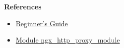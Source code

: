 \documentclass[12pt, a4paper]{article}
\begin{document}
\begin{enumerate}[resume]
    \vspace{\baselineskip}
    \textbf{References}
    \begin{itemize}
      \item \href{https://nginx.org/en/docs/beginners_guide.html}{Beginner's Guide}
      \item \href{https://nginx.org/en/docs/http/ngx_http_proxy_module.html}{Module ngx\_http\_proxy\_module}
    \end{itemize}
  \end{enumerate}
\end{document}
